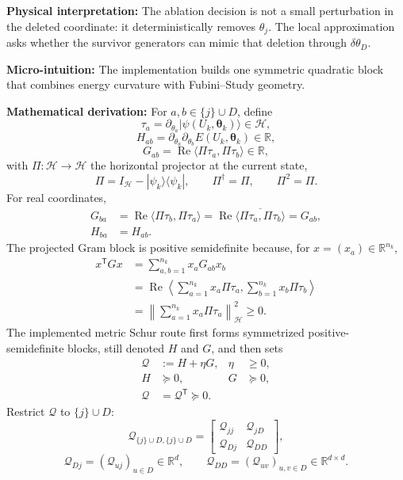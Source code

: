 \documentclass[10pt,twocolumn]{article}
\newcommand{\ket}[1]{|#1\rangle}
\newcommand{\bra}[1]{\langle #1|}
\newcommand{\blocktitle}[1]{\vspace{2pt}\noindent\textbf{#1}\space}
\newcommand{\micro}[1]{\blocktitle{Micro-intuition:} #1}
\newcommand{\deriv}{\blocktitle{Mathematical derivation:}}
\newcommand{\phys}[1]{\blocktitle{Physical interpretation:} #1}
\begin{document}
\phys{The ablation decision is not a small perturbation in the deleted coordinate: it deterministically removes \(\theta_j\). The local approximation asks whether the survivor generators can mimic that deletion through \(\delta\theta_D\).}

\micro{The implementation builds one symmetric quadratic block that combines energy curvature with Fubini--Study geometry.}

\deriv
For \(a,b\in\{j\}\cup D\), define
\[
\tau_a
=
\partial_{\theta_a}\ket{\psi(U_k,\boldsymbol\theta_k)}
\in\mathcal H,
\]
\[
H_{ab}
=
\partial_{\theta_a}\partial_{\theta_b}
E(U_k,\boldsymbol\theta_k)
\in\mathbb R,
\]
\[
G_{ab}
=
\operatorname{Re}\langle \Pi\tau_a,\Pi\tau_b\rangle
\in\mathbb R,
\]
with \(\Pi:\mathcal H\to\mathcal H\) the horizontal projector at the current state,
\[
\Pi=I_{\mathcal H}-\ket{\psi_k}\bra{\psi_k},
\qquad
\Pi^\dagger=\Pi,
\qquad
\Pi^2=\Pi .
\]
For real coordinates,
\[
\begin{aligned}
G_{ba}
&=
\operatorname{Re}\langle \Pi\tau_b,\Pi\tau_a\rangle
=
\operatorname{Re}\overline{\langle \Pi\tau_a,\Pi\tau_b\rangle}
=G_{ab},
\\
H_{ba}&=H_{ab}.
\end{aligned}
\]
The projected Gram block is positive semidefinite because, for \(x=(x_a)\in\mathbb R^{n_k}\),
\[
\begin{aligned}
x^{\mathsf T}Gx
&=
\sum_{a,b=1}^{n_k}x_aG_{ab}x_b
\\
&=
\operatorname{Re}
\left\langle
\sum_{a=1}^{n_k}x_a\Pi\tau_a,
\sum_{b=1}^{n_k}x_b\Pi\tau_b
\right\rangle
\\
&=
\left\|
\sum_{a=1}^{n_k}x_a\Pi\tau_a
\right\|_{\mathcal H}^{2}
\ge0 .
\end{aligned}
\]
The implemented metric Schur route first forms symmetrized positive-semidefinite blocks, still denoted \(H\) and \(G\), and then sets
\[
\begin{aligned}
\mathcal Q&:=H+\eta G,
&
\eta&\ge 0,
\\
H&\succeq0,
&
G&\succeq0,
\\
\mathcal Q&=\mathcal Q^{\mathsf T}\succeq0.
\end{aligned}
\]
Restrict \(\mathcal Q\) to \(\{j\}\cup D\):
\[
\mathcal Q_{\{j\}\cup D,\{j\}\cup D}
=
\begin{bmatrix}
\mathcal Q_{jj} & \mathcal Q_{jD}\\
\mathcal Q_{Dj} & \mathcal Q_{DD}
\end{bmatrix},
\]
\[
\mathcal Q_{Dj}=(\mathcal Q_{uj})_{u\in D}\in\mathbb R^d,
\qquad
\mathcal Q_{DD}=(\mathcal Q_{uv})_{u,v\in D}\in\mathbb R^{d\times d}.
\]
\end{document}
